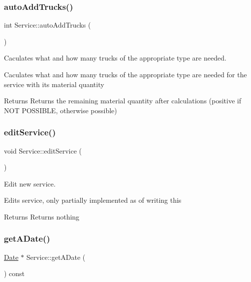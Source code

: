 \subsubsection{\texorpdfstring{auto\+Add\+Trucks()}{autoAddTrucks()}}
{\footnotesize\ttfamily int Service\+::auto\+Add\+Trucks (\begin{DoxyParamCaption}{ }\end{DoxyParamCaption})\hspace{0.3cm}{\ttfamily [protected]}}



Caculates what and how many trucks of the appropriate type are needed. 

Caculates what and how many trucks of the appropriate type are needed for the service with it\textquotesingle{}s material quantity

\begin{DoxyReturn}{Returns}
Returns the remaining material quantity after calculations (positive if N\+OT P\+O\+S\+S\+I\+B\+LE, otherwise possible) 
\end{DoxyReturn}
\mbox{\label{class_service_a351a27eebc07d1ff3f433d6ad356925a}} 
\subsubsection{\texorpdfstring{edit\+Service()}{editService()}}
{\footnotesize\ttfamily void Service\+::edit\+Service (\begin{DoxyParamCaption}{ }\end{DoxyParamCaption})}



Edit new service. 

Edits service, only partially implemented as of writing this

\begin{DoxyReturn}{Returns}
Returns nothing 
\end{DoxyReturn}
\mbox{\label{class_service_a2b08c3d53ab2246eb3cca649c2baa100}} 
\subsubsection{\texorpdfstring{get\+A\+Date()}{getADate()}}
{\footnotesize\ttfamily \hyperlink{class_date}{Date} $\ast$ Service\+::get\+A\+Date (\begin{DoxyParamCaption}{ }\end{DoxyParamCaption}) const}




